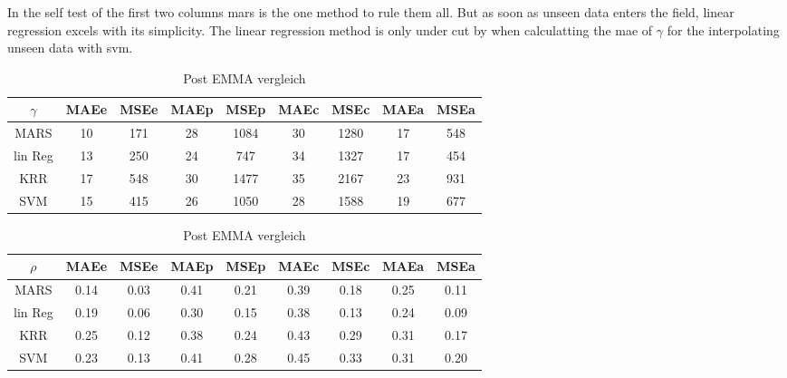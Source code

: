 In the self test of the first two columns \gls{mars} is the one method to rule them all.
But as soon as unseen data enters the field, linear regression excels with its simplicity. 
The linear regression method is only under cut by when calculatting the \gls{mae} of $\gamma$
for the interpolating unseen data with \gls{svm}. 
%
%
\begin{table}[htb]
	\centering
    \caption{Post EMMA vergleich}
	\label{tab:post-emma}
	\begin{tabular}{c cc cc cc cc}
    \hline\hline
    $\gamma$&  MAEe&   MSEe&   MAEp&   MSEp&   MAEc&   MSEc&   MAEa& MSEa \\
    \hline
        MARS&   10& 171&    28& 1084&   30& 1280&   17& 548\\
        lin Reg&    13& 250&    24& 747&    34& 1327&   17& 454\\
        KRR &17 &548 &30 &1477 &35 &2167 &23 &931\\
        SVM& 15&  415&    26& 1050&   28& 1588&   19& 677\\
    \hline\hline
	\end{tabular}
	\begin{tabular}{c cc cc cc cc}
    \hline\hline
    $\rho$&  MAEe&   MSEe&   MAEp&   MSEp&   MAEc&   MSEc&   MAEa& MSEa \\
    \hline
        MARS&   0.14&   0.03&   0.41&   0.21&   0.39&   0.18&   0.25&   0.11\\
        lin Reg&    0.19&   0.06&   0.30&   0.15&   0.38&   0.13&   0.24&   0.09\\
        KRR &0.25 &0.12 &0.38 &0.24 &0.43 &0.29 &0.31 &0.17\\
        SVM &0.23 &0.13 &0.41 &0.28 &0.45 &0.33 &0.31 &0.20\\
    \hline\hline
	\end{tabular}
\end{table}
    
